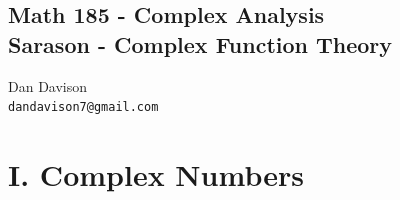 \documentclass[12pt]{article}
\begin{document}
\begin{center}
  \section*{
    Math 185 - Complex Analysis\\
    Sarason - Complex Function Theory\\
  }
\end{center}
\begin{center}
  \small{
    Dan Davison\\
    \texttt{dandavison7@gmail.com}
  }
\end{center}

\section*{I. Complex Numbers}
\end{document}
